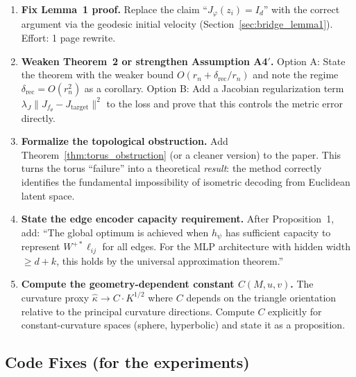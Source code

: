 \documentclass{article}
\begin{document}
\begin{enumerate}[label=\textbf{T\arabic*.}]
\item \textbf{Fix Lemma~1 proof.}
  Replace the claim ``$J_\varphi(z_i) = I_d$'' with the correct argument via
  the geodesic initial velocity (Section~\ref{sec:bridge_lemma1}).
  Effort: 1 page rewrite.

\item \textbf{Weaken Theorem~2 or strengthen Assumption A4$'$.}
  Option A: State the theorem with the weaker bound
  $O(r_n + \delta_{\text{rec}}/r_n)$ and note the regime
  $\delta_{\text{rec}} = O(r_n^2)$ as a corollary.
  Option B: Add a Jacobian regularization term $\lambda_J \|J_{f_\theta} - J_{\text{target}}\|^2$
  to the loss and prove that this controls the metric error directly.

\item \textbf{Formalize the topological obstruction.}
  Add Theorem~\ref{thm:torus_obstruction} (or a cleaner version) to the paper.
  This turns the torus ``failure'' into a theoretical \textit{result}: the
  method correctly identifies the fundamental impossibility of isometric
  decoding from Euclidean latent space.

\item \textbf{State the edge encoder capacity requirement.}
  After Proposition~1, add: ``The global optimum is achieved when
  $h_\psi$ has sufficient capacity to represent $W^{+*}\ell_{ij}$ for
  all edges. For the MLP architecture with hidden width $\geq d + k$,
  this holds by the universal approximation theorem.''

\item \textbf{Compute the geometry-dependent constant $C(M, u, v)$.}
  The curvature proxy $\hat{\kappa} \to C \cdot K^{1/2}$ where $C$ depends
  on the triangle orientation relative to the principal curvature directions.
  Compute $C$ explicitly for constant-curvature spaces (sphere, hyperbolic)
  and state it as a proposition.
\end{enumerate}

\subsection{Code Fixes (for the experiments)}
\end{document}
